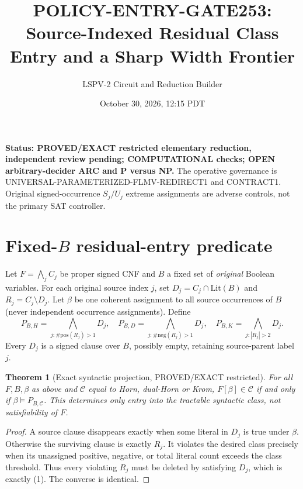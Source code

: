\documentclass[11pt]{article}
\title{POLICY-ENTRY-GATE253: Source-Indexed Residual Class Entry and a Sharp Width Frontier}
\author{LSPV-2 Circuit and Reduction Builder}
\date{October 30, 2026, 12:15 PDT}
\newtheorem{theorem}{Theorem}
\begin{document}
\maketitle
\noindent\textbf{Status: PROVED/EXACT restricted elementary reduction, independent review pending; COMPUTATIONAL checks; OPEN arbitrary-decider ARC and P versus NP.}
The operative governance is UNIVERSAL-PARAMETERIZED-FLMV-REDIRECT1 and CONTRACT1. Original signed-occurrence $S_j/U_j$ extreme assignments are adverse controls, not the primary SAT controller.

\section{Fixed-$B$ residual-entry predicate}
Let $F=\bigwedge_j C_j$ be proper signed CNF and $B$ a fixed set of \emph{original} Boolean variables. For each original source index $j$, set $D_j=C_j\cap \mathrm{Lit}(B)$ and $R_j=C_j\setminus D_j$. Let $\beta$ be one coherent assignment to all source occurrences of $B$ (never independent occurrence assignments). Define
\[
P_{B,H}=\bigwedge_{j:\#\mathrm{pos}(R_j)>1}D_j,\quad
P_{B,D}=\bigwedge_{j:\#\mathrm{neg}(R_j)>1}D_j,\quad
P_{B,K}=\bigwedge_{j:|R_j|>2}D_j.
\tag{1}
\]
Every $D_j$ is a signed clause over $B$, possibly empty, retaining source-parent label $j$.

\begin{theorem}[Exact syntactic projection, PROVED/EXACT restricted]
For all $F,B,\beta$ as above and $\mathcal C$ equal to Horn, dual-Horn or Krom, $F[\beta]\in\mathcal C$ if and only if $\beta\models P_{B,\mathcal C}$. This determines only entry into the tractable syntactic class, not satisfiability of $F$.
\end{theorem}
\begin{proof}
A source clause disappears exactly when some literal in $D_j$ is true under $\beta$. Otherwise the surviving clause is exactly $R_j$. It violates the desired class precisely when its unassigned positive, negative, or total literal count exceeds the class threshold. Thus every violating $R_j$ must be deleted by satisfying $D_j$, which is exactly (1). The converse is identical.
\end{proof}
\end{document}

